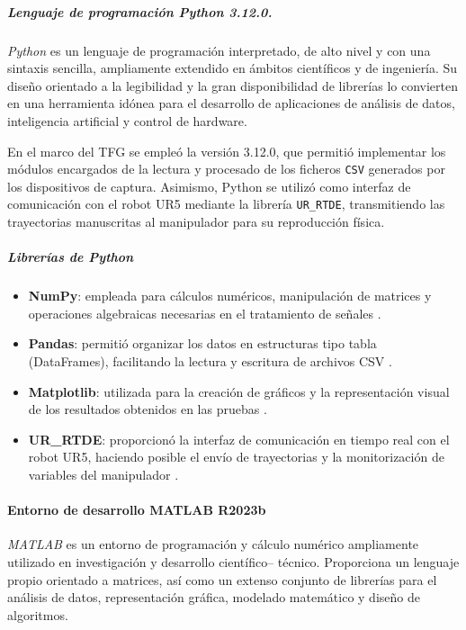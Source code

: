 \documentclass[12pt,a4paper,oneside]{report}
\begin{document}
\subparagraph{Lenguaje de programación Python 3.12.0.}\textit{Python}
es un lenguaje de programación interpretado, de 
alto nivel y con una sintaxis sencilla, ampliamente extendido en 
ámbitos científicos y de ingeniería. Su diseño orientado a la 
legibilidad y la gran disponibilidad de librerías lo convierten en 
una herramienta idónea para el desarrollo de aplicaciones de 
análisis de datos, inteligencia artificial y control de hardware. \cite{python}

En el marco del TFG se empleó la versión 3.12.0, que permitió 
implementar los módulos encargados de la lectura y procesado de 
los ficheros \texttt{CSV} generados por los dispositivos de 
captura. Asimismo, Python se utilizó como interfaz de 
comunicación con el robot \acrshort{UR5} mediante la librería 
\texttt{UR\_RTDE}, transmitiendo las trayectorias manuscritas al 
manipulador para su reproducción física. 

\subparagraph{Librerías de Python}

\begin{itemize}
  \item \textbf{NumPy}: empleada para cálculos numéricos, 
        manipulación de matrices y operaciones algebraicas 
        necesarias en el tratamiento de señales \cite{numpy}.
  \item \textbf{Pandas}: permitió organizar los datos en 
        estructuras tipo tabla (DataFrames), facilitando la 
        lectura y escritura de archivos CSV \cite{pandas}.
  \item \textbf{Matplotlib}: utilizada para la creación de 
        gráficos y la representación visual de los resultados 
        obtenidos en las pruebas \cite{matplotlib}.
  \item \textbf{UR\_RTDE}: proporcionó la interfaz de 
        comunicación en tiempo real con el robot 
        \acrshort{UR5}, haciendo posible el envío de trayectorias 
        y la monitorización de variables del manipulador \cite{ur_rtde}.
\end{itemize}

\paragraph{Entorno de desarrollo MATLAB R2023b}

\textit{MATLAB} es un entorno de programación y cálculo numérico 
ampliamente utilizado en investigación y desarrollo científico–
técnico. Proporciona un lenguaje propio orientado a matrices, así 
como un extenso conjunto de librerías para el análisis de datos, 
representación gráfica, modelado matemático y diseño de 
algoritmos.\cite{matlab2023} 
\end{document}
